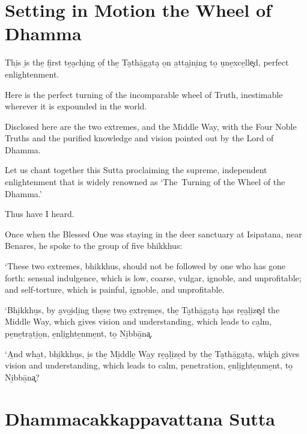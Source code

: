 \chapterTocDelegatePageNumber
\chapter{Setting in Motion the Wheel of Dhamma}

\setTocDelegatedPageNumber
\englishText
\renewcommand{\englishTitle}{Setting in Motion the Wheel of Dhamma}

\begin{leader}

Thi̱s i̱s the̱ fi̱rst te̱a̮chi̱ng o̱f the̱ Ta̮thā̱ga̮ta̮ o̱n a̱tta̱i̮ni̱ng to̱ u̮ne̱xce̱lle͓d,
perfect enlightenment.

Here is the perfect turning of the incomparable wheel of Truth,
inestimable wherever it is expounded in the world.

Disclosed here are the two extremes, and the Middle Way, with the Four Noble
Truths and the purified knowledge and vision pointed out by the Lord of
Dhamma.

Let us chant together this Sutta proclaiming the supreme, independent
enlightenment that is widely renowned as ‘The~Turning of the Wheel of
the Dhamma.’

\end{leader}

Thus have I heard.

Once when the Blessed One was staying in the deer sanctuary at
Isipatana, near Benares, he spoke to the group of five bhikkhus:

‘These two extremes, bhikkhus, should not be followed by one who has
gone forth: sensual indulgence, which is low, coarse, vulgar, ignoble,
and unprofitable; and self-torture, which is painful, ignoble, and
unprofitable.

‘Bhi̱kkhu̱s, by a̮vo̱i̮di̱ng the̱se̱ two̱ e̱xtre̱me̱s, the̱ Ta̮thā̱ga̮ta̮ ha̱s re̱a̮li̱ze͓d
the Middle Way, which gives vision and understanding, which leads to
ca̱lm, pe̱ne̱tra̮ti̱o̱n, e̱nli̱ghte̱nme̱nt, to̱ Ni̱bbā̱na͓.

‘A̱nd wha̱t, bhi̱kkhu̱s, i̱s the̱ Mi̱ddle̱ Wa̱y re̱a̮li̱ze̱d by the̱ Ta̮thā̱ga̮ta̮, whi͓ch
gives vision and understanding, which leads to calm, penetration,
e̱nli̱ghte̱nme̱nt, to̱ Ni̱bbā̱na͓?

\chapterTocSubIndentTrue
\chapter{Dhammacakkappavattana Sutta}

